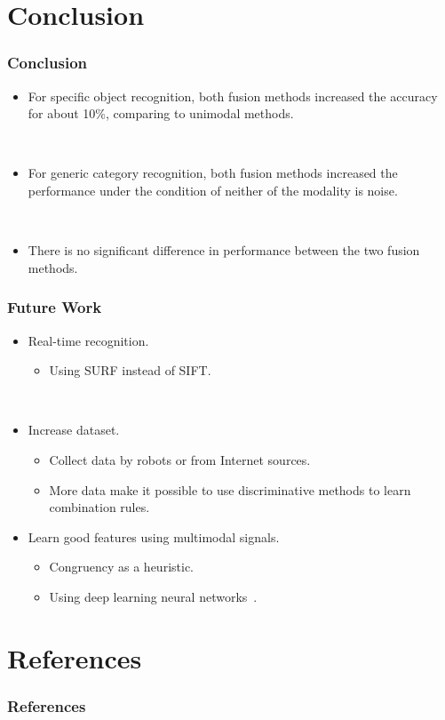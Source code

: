 \documentclass{beamer}
\begin{document}
\section{Conclusion}
\begin{frame}
  \frametitle{Conclusion}

  \begin{itemize}
    \item For specific object recognition, both fusion methods increased the accuracy for about 10\%, comparing to unimodal methods.

      ~
    \item For generic category recognition, both fusion methods increased the performance under the condition of neither of the modality is noise.

      ~
    \item There is no significant difference in performance between the two fusion methods.
  \end{itemize}
\end{frame}

\begin{frame}
  \frametitle{Future Work}

  \begin{itemize}
    \item Real-time recognition.
      \begin{itemize}
        \item Using SURF instead of SIFT.
      \end{itemize}

      ~
    \item Increase dataset.
      \begin{itemize}
        \item Collect data by robots or from Internet sources.
        \item More data make it possible to use discriminative methods to learn combination rules.
      \end{itemize}

    \item Learn good features using multimodal signals.
      \begin{itemize}
        \item Congruency as a heuristic.
        \item Using deep learning neural networks~\cite{ngiam_multimodal_2011}.
      \end{itemize}
  \end{itemize}
\end{frame}


\appendix
\section*{References}
\begin{frame}[allowframebreaks]
  \frametitle{References}
  {\scriptsize
    
      
  }
\end{frame}
\end{document}
